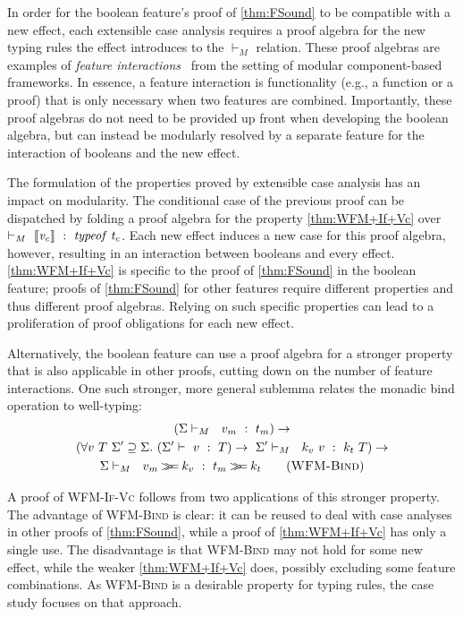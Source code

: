 In order for the boolean feature's proof of \ref{thm:FSound} to be
compatible with a new effect, each extensible case analysis requires a
proof algebra for the new typing rules the effect introduces to the $\vdash_M$
relation. These proof algebras are examples of
\emph{feature interactions}~\cite{featureinteractions} from the
setting of modular component-based frameworks. In essence, a feature
interaction is functionality (e.g., a function or a proof) that is
only necessary when two features are combined. Importantly, these
proof algebras do not need to be provided up front when developing the
boolean algebra, but can instead be modularly resolved by a separate
feature for the interaction of booleans and the new effect.



The formulation of the properties proved by extensible case analysis
has an impact on modularity. The conditional case of the previous
proof can be dispatched by folding a proof algebra for the property
\ref{thm:WFM+If+Vc} over $\vdash_M~\llbracket \mathit{v}_{\mathit{c}}\rrbracket~:~\mathit{typeof}\;\mathit{t}_{\mathit{c}}$. Each
new effect induces a new case for this proof algebra, however,
resulting in an interaction between booleans and every
effect. \ref{thm:WFM+If+Vc} is specific to the proof of
\ref{thm:FSound} in the boolean feature; proofs of \ref{thm:FSound}
for other features require different properties and thus different
proof algebras. Relying on such specific properties can lead to a
proliferation of proof obligations for each new effect.

Alternatively, the boolean feature can use a proof algebra for a
stronger property that is also applicable in other proofs, cutting
down on the number of feature interactions. One such stronger, more
general sublemma relates the monadic bind operation to well-typing:
\begin{multline}
 (\Sigma\vdash_M~~ v_m ~:~t_m) \rightarrow \\
   (\forall v~T~\Sigma'\supseteq\Sigma.~(\Sigma'\vdash~v~:~T) \rightarrow
   ~\Sigma'\vdash_M~~ k_v~v~:~ k_t~T) \rightarrow \\
   \Sigma\vdash_M~~v_m \ensuremath{\bind } k_v~:~t_m \ensuremath{\bind } k_t
\tag{\textsc{WFM-Bind}}\label{thm:WFM+Bind}
\end{multline}

A proof of \textsc{WFM-If-Vc} follows from two applications of this
stronger property. The advantage of \textsc{WFM-Bind} is clear: it can
be reused to deal with case analyses in other proofs of
\ref{thm:FSound}, while a proof of \ref{thm:WFM+If+Vc} has only a
single use. The disadvantage is that \textsc{WFM-Bind} may not hold
for some new effect, while the weaker \ref{thm:WFM+If+Vc} does,
possibly excluding some feature combinations. As \textsc{WFM-Bind} is
a desirable property for typing rules, the case study focuses on that
approach.

